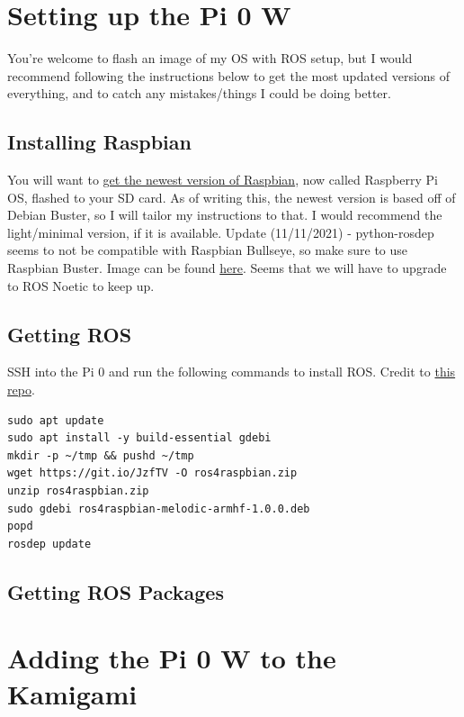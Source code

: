 \documentclass[11pt]{article}
\begin{document}
\section{Setting up the Pi 0 W}

You're welcome to flash an image of my OS with ROS setup, but I would recommend following the instructions below to get the most updated versions of everything, and to catch any mistakes/things I could be doing better.

\subsection{Installing Raspbian}

    You will want to \href{https://www.raspberrypi.org/downloads/raspberry-pi-os/}{get the newest version of Raspbian}, now called Raspberry Pi OS, flashed to your SD card. As of writing this, the newest version is based off of Debian Buster, so I will tailor my instructions to that. I would recommend the light/minimal version, if it is available.
    \linebreak\newline
    Update (11/11/2021) - python-rosdep seems to not be compatible with Raspbian Bullseye, so make sure to use Raspbian Buster. Image can be found \href{http://downloads.raspberrypi.org/raspbian/images/raspbian-2020-02-14/}{here}. Seems that we will have to upgrade to ROS Noetic to keep up.

\subsection{Getting ROS}
SSH into the Pi 0 and run the following commands to install ROS. Credit to \href{https://github.com/Tiryoh/ros_melodic_raspbian}{this repo}.

    \begin{verbatim}
sudo apt update
sudo apt install -y build-essential gdebi
mkdir -p ~/tmp && pushd ~/tmp
wget https://git.io/JzfTV -O ros4raspbian.zip
unzip ros4raspbian.zip
sudo gdebi ros4raspbian-melodic-armhf-1.0.0.deb
popd
rosdep update
    \end{verbatim}

\subsection{Getting ROS Packages}

\section{Adding the Pi 0 W to the Kamigami}
\end{document}
